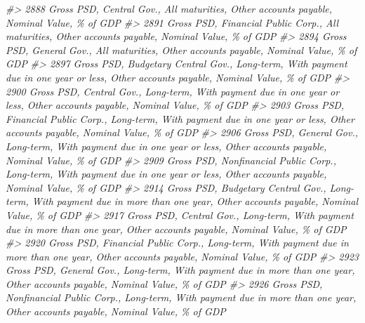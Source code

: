 \documentclass[
]{bxjsbook}
\newenvironment{Shaded}{\begin{snugshade}}{\end{snugshade}}
\newcommand{\CommentTok}[1]{\textcolor[rgb]{0.56,0.35,0.01}{\textit{#1}}}
\theoremstyle{definition}
\theoremstyle{definition}
\theoremstyle{definition}
\theoremstyle{definition}
\theoremstyle{remark}
\begin{document}
\begin{Shaded}
\begin{Highlighting}[]
\CommentTok{\#\textgreater{} 2888                                                                                   Gross PSD, Central Gov., All maturities, Other accounts payable, Nominal Value, \% of GDP}
\CommentTok{\#\textgreater{} 2891                                                                         Gross PSD, Financial Public Corp., All maturities, Other accounts payable, Nominal Value, \% of GDP}
\CommentTok{\#\textgreater{} 2894                                                                                   Gross PSD, General Gov., All maturities, Other accounts payable, Nominal Value, \% of GDP}
\CommentTok{\#\textgreater{} 2897                                        Gross PSD, Budgetary Central Gov., Long{-}term, With payment due in one year or less, Other accounts payable, Nominal Value, \% of GDP}
\CommentTok{\#\textgreater{} 2900                                                  Gross PSD, Central Gov., Long{-}term, With payment due in one year or less, Other accounts payable, Nominal Value, \% of GDP}
\CommentTok{\#\textgreater{} 2903                                        Gross PSD, Financial Public Corp., Long{-}term, With payment due in one year or less, Other accounts payable, Nominal Value, \% of GDP}
\CommentTok{\#\textgreater{} 2906                                                  Gross PSD, General Gov., Long{-}term, With payment due in one year or less, Other accounts payable, Nominal Value, \% of GDP}
\CommentTok{\#\textgreater{} 2909                                     Gross PSD, Nonfinancial Public Corp., Long{-}term, With payment due in one year or less, Other accounts payable, Nominal Value, \% of GDP}
\CommentTok{\#\textgreater{} 2914                                      Gross PSD, Budgetary Central Gov., Long{-}term, With payment due in more than one year, Other accounts payable, Nominal Value, \% of GDP}
\CommentTok{\#\textgreater{} 2917                                                Gross PSD, Central Gov., Long{-}term, With payment due in more than one year, Other accounts payable, Nominal Value, \% of GDP}
\CommentTok{\#\textgreater{} 2920                                      Gross PSD, Financial Public Corp., Long{-}term, With payment due in more than one year, Other accounts payable, Nominal Value, \% of GDP}
\CommentTok{\#\textgreater{} 2923                                                Gross PSD, General Gov., Long{-}term, With payment due in more than one year, Other accounts payable, Nominal Value, \% of GDP}
\CommentTok{\#\textgreater{} 2926                                   Gross PSD, Nonfinancial Public Corp., Long{-}term, With payment due in more than one year, Other accounts payable, Nominal Value, \% of GDP}

\end{Highlighting}
\end{Shaded}
\end{document}
